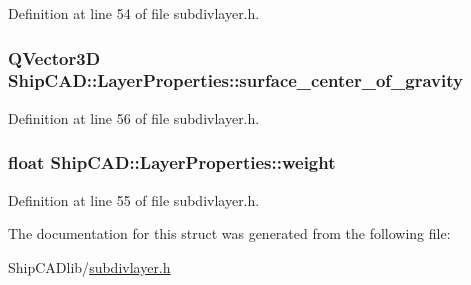Definition at line 54 of file subdivlayer.\-h.

\hypertarget{structShipCAD_1_1LayerProperties_a1b4bc8254c8cb90df594bc7905ce3e22}{
\subsubsection[{surface\-\_\-center\-\_\-of\-\_\-gravity}]{\setlength{\rightskip}{0pt plus 5cm}Q\-Vector3\-D Ship\-C\-A\-D\-::\-Layer\-Properties\-::surface\-\_\-center\-\_\-of\-\_\-gravity}}\label{structShipCAD_1_1LayerProperties_a1b4bc8254c8cb90df594bc7905ce3e22}


Definition at line 56 of file subdivlayer.\-h.

\hypertarget{structShipCAD_1_1LayerProperties_a4e9844dd95994725401ad93c5c3a00e9}{
\subsubsection[{weight}]{\setlength{\rightskip}{0pt plus 5cm}float Ship\-C\-A\-D\-::\-Layer\-Properties\-::weight}}\label{structShipCAD_1_1LayerProperties_a4e9844dd95994725401ad93c5c3a00e9}


Definition at line 55 of file subdivlayer.\-h.



The documentation for this struct was generated from the following file\-:\begin{DoxyCompactItemize}
\item 
Ship\-C\-A\-Dlib/\hyperlink{subdivlayer_8h}{subdivlayer.\-h}\end{DoxyCompactItemize}
